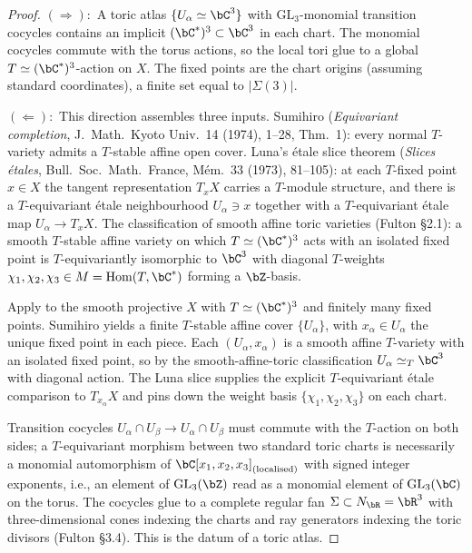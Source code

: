 \begin{proof}
\emph{$(\Rightarrow)$}:\ A toric atlas $\{U_\alpha \simeq \bC^3\}$
with $\mathrm{GL}_3$-monomial transition cocycles contains an implicit
$(\bC^\ast)^3 \subset \bC^3$ in each chart. The monomial cocycles
commute with the torus actions, so the local tori glue to a global
$T \simeq (\bC^\ast)^3$-action on $X$. The fixed points are the chart
origins (assuming standard coordinates), a finite set equal to
$|\Sigma(3)|$.

\emph{$(\Leftarrow)$}:\ This direction assembles three inputs.
Sumihiro (\emph{Equivariant completion}, J.\ Math.\ Kyoto Univ.\ 14
(1974), 1--28, Thm.~1): every normal $T$-variety admits a $T$-stable
affine open cover. Luna's étale slice theorem (\emph{Slices étales},
Bull.\ Soc.\ Math.\ France, Mém.\ 33 (1973), 81--105): at each
$T$-fixed point $x \in X$ the tangent representation $T_x X$ carries a
$T$-module structure, and there is a $T$-equivariant étale neighbourhood
$U_\alpha \ni x$ together with a $T$-equivariant étale map
$U_\alpha \to T_x X$. The classification of smooth affine toric
varieties (Fulton \S2.1): a smooth $T$-stable affine variety on which
$T \simeq (\bC^\ast)^3$ acts with an isolated fixed point is
$T$-equivariantly isomorphic to $\bC^3$ with diagonal
$T$-weights $\chi_1, \chi_2, \chi_3 \in M = \mathrm{Hom}(T, \bC^\ast)$
forming a $\bZ$-basis.

Apply to the smooth projective $X$ with $T \simeq (\bC^\ast)^3$ and
finitely many fixed points. Sumihiro yields a finite $T$-stable affine
cover $\{U_\alpha\}$, with $x_\alpha \in U_\alpha$ the unique fixed
point in each piece. Each $(U_\alpha, x_\alpha)$ is a smooth affine
$T$-variety with an isolated fixed point, so by the smooth-affine-toric
classification $U_\alpha \simeq_T \bC^3$ with diagonal action. The
Luna slice supplies the explicit $T$-equivariant étale comparison to
$T_{x_\alpha} X$ and pins down the weight basis $\{\chi_1, \chi_2,
\chi_3\}$ on each chart.

Transition cocycles $U_\alpha \cap U_\beta \to U_\alpha \cap U_\beta$
must commute with the $T$-action on both sides; a $T$-equivariant
morphism between two standard toric charts is necessarily a monomial
automorphism of $\bC[x_1, x_2, x_3]_{(\text{localised})}$ with signed
integer exponents, i.e., an element of $\mathrm{GL}_3(\bZ)$ read as a
monomial element of $\mathrm{GL}_3(\bC)$ on the torus. The cocycles
glue to a complete regular fan $\Sigma \subset N_\bR = \bR^3$ with
three-dimensional cones indexing the charts and ray generators indexing
the toric divisors (Fulton \S3.4). This is the datum of a toric atlas.
\end{proof}

